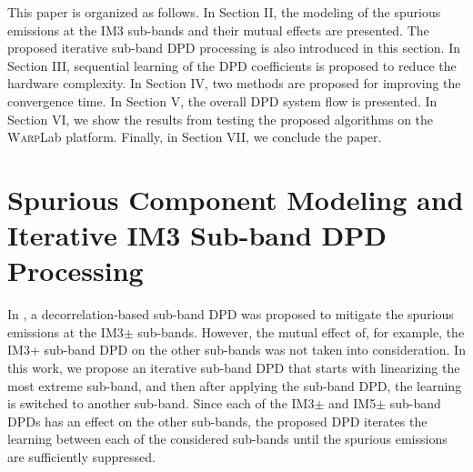 This paper is organized as follows. 
In Section II, the modeling of the spurious emissions at the IM3 sub-bands and their mutual effects are presented.
The proposed iterative sub-band DPD processing is also introduced in this section. 
In Section III, sequential learning of the DPD coefficients is proposed to reduce the hardware complexity. 
In Section IV, two methods are proposed for improving the convergence time. 
In Section V, the overall DPD system flow is presented. 
In Section VI, we show the results from testing the proposed algorithms on the \textsc{Warp}Lab platform. 
Finally, in Section VII, we conclude the paper.

\section{Spurious Component Modeling and Iterative IM3 Sub-band DPD Processing}
\label{sec:Analysis}
In \cite{ICASSP2014}, a decorrelation-based sub-band DPD was proposed to mitigate the spurious emissions at the IM3$\pm$ sub-bands. 
However, the mutual effect of, for example, the IM3+ sub-band DPD on the other sub-bands was not taken into consideration. 
In this work, we propose an iterative sub-band DPD that starts with linearizing the most extreme sub-band, and then after applying the sub-band DPD, the learning is switched to another sub-band. 
Since each of the IM3$\pm$ and IM5$\pm$ sub-band DPDs has an effect on the other sub-bands, the proposed DPD iterates the learning between each of the considered sub-bands until the spurious emissions are sufficiently suppressed.

